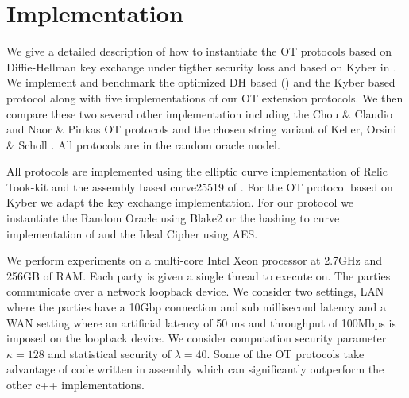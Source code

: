 \section{Implementation}\label{sec:impl}

We give a detailed description of how to instantiate the OT protocols based on Diffie-Hellman key exchange under tigther security loss and based on Kyber in . We implement and benchmark the optimized DH based () and the Kyber based protocol along with five implementations of our OT extension protocols. We then compare these two several other implementation including the Chou \& Claudio \cite{LC:ChoOrl15} and Naor \& Pinkas \cite{SODA:NaoPin01} OT protocols and the chosen string variant of Keller, Orsini \& Scholl \cite{C:KelOrsSch15}.  All protocols are in the random oracle model.

All protocols are implemented 
using the elliptic curve implementation of Relic Took-kit\cite{relic} and the assembly based curve25519 of \cite{LC:ChoOrl15,simplest}. For the OT protocol based on Kyber we adapt the \cite{NISTPQC-R1:CRYSTALS-KYBER17} key exchange implementation. For our protocol we instantiate the Random Oracle using Blake2 or the hashing to curve implementation of \cite{relic} and the Ideal Cipher using AES.

We perform experiments on a multi-core Intel Xeon processor at 2.7GHz and 256GB of RAM. Each party is given a single thread to execute on. The parties communicate over a network loopback device. We consider two settings, LAN where the parties have a 10Gbp connection and sub millisecond latency and a WAN setting where an artificial latency of 50 ms and throughput of 100Mbps is imposed on the loopback device. We consider computation security parameter $\kappa=128$ and statistical security of $\lambda=40$.  Some of the OT protocols take advantage of code written in assembly which can significantly outperform the other c++ implementations.
\newcommand{\mr}[2]{\multirow{#1}{*}{#2}}

